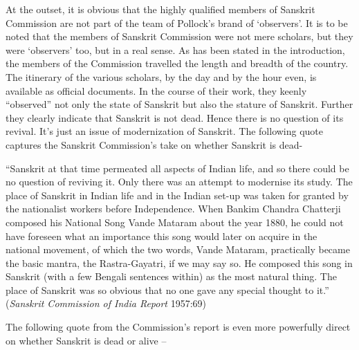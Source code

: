 At the outset, it is obvious that the highly qualified members of Sanskrit Commission are not part of the team of Pollock’s brand of ‘observers’. It is to be noted that the members of Sanskrit Commission were not mere scholars, but they were ‘observers’ too, but in a real sense. As has been stated in the introduction, the members of the Commission travelled the length and breadth of the country. The itinerary of the various scholars, by the day and by the hour even, is available as official documents. In the course of their work, they keenly “observed” not only the state of Sanskrit but also the stature of Sanskrit. Further they clearly indicate that Sanskrit is not dead. Hence there is no question of its revival. It’s just an issue of  modernization of Sanskrit. The following quote captures the Sanskrit Commission’s take on whether Sanskrit is dead-
\begin{myquote}
\eleven
“Sanskrit at that time permeated all aspects of Indian life, and so there could be no question of reviving it. Only there was an attempt to modernise its study. The place of Sanskrit in Indian life and in the Indian set-up was taken for granted by the nationalist workers before Independence. When Bankim Chandra Chatterji composed his National Song Vande Mataram about the year 1880, he could not have foreseen what an importance this song would later on acquire in the national movement, of which the two words, Vande Mataram, practically became the basic mantra, the Rastra-Gayatri, if we may say so. He composed this song in Sanskrit (with a few Bengali sentences within) as the most natural thing. The place of Sanskrit was so obvious that no one gave any special thought to it.” \hfill({\sl Sanskrit Commission of India Report} 1957:69)
\end{myquote}

The following quote from the Commission’s report is even more powerfully direct on whether Sanskrit is dead or alive  – 
\newpage

